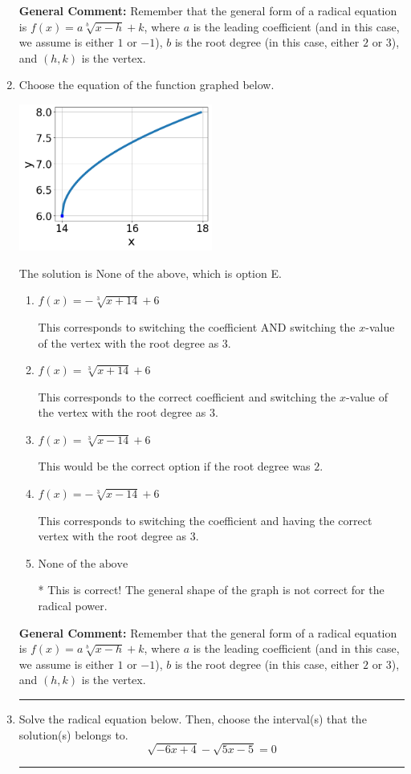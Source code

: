\documentclass{extbook}[14pt]
\newcommand{\litem}[1]{\item #1

\rule{\textwidth}{0.4pt}}
\begin{document}
\begin{enumerate}
{\textbf{General Comment:} Remember that the general form of a radical equation is $ f(x) = a \sqrt[b]{x - h} + k$, where $a$ is the leading coefficient (and in this case, we assume is either $1$ or $-1$), $b$ is the root degree (in this case, either $2$ or $3$), and $(h, k)$ is the vertex.
}
\litem{
Choose the equation of the function graphed below.

\begin{center}
    \includegraphics[width=0.5\textwidth]{../Figures/radicalGraphToEquationA.png}
\end{center}




The solution is \( \text{None of the above} \), which is option E.\begin{enumerate}[label=\Alph*.]
\item \( f(x) = - \sqrt[3]{x + 14} + 6 \)

This corresponds to switching the coefficient AND switching the $x$-value of the vertex with the root degree as $3$.
\item \( f(x) = \sqrt[3]{x + 14} + 6 \)

This corresponds to the correct coefficient and switching the $x$-value of the vertex with the root degree as $3$.
\item \( f(x) = \sqrt[3]{x - 14} + 6 \)

This would be the correct option if the root degree was $2$.
\item \( f(x) = - \sqrt[3]{x - 14} + 6 \)

This corresponds to switching the coefficient and having the correct vertex with the root degree as $3$.
\item \( \text{None of the above} \)

* This is correct! The general shape of the graph is not correct for the radical power.
\end{enumerate}

\textbf{General Comment:} Remember that the general form of a radical equation is $ f(x) = a \sqrt[b]{x - h} + k$, where $a$ is the leading coefficient (and in this case, we assume is either $1$ or $-1$), $b$ is the root degree (in this case, either $2$ or $3$), and $(h, k)$ is the vertex.
}
\litem{
Solve the radical equation below. Then, choose the interval(s) that the solution(s) belongs to.
\[ \sqrt{-6 x + 4} - \sqrt{5 x - 5} = 0 \]

}
\end{enumerate}
\end{document}
